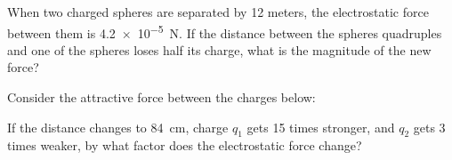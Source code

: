 \documentclass[dvipsnames]{article}
\numberwithin{equation}{section}
\numberwithin{figure}{section}
\begin{document}
\begin{exercise} \label{yCR62E}
    When two charged spheres are separated by 12 meters, the electrostatic force between them is \SI{4.2e-5}{N}. If the distance between the spheres quadruples and one of the spheres loses half its charge, what is the magnitude of the new force?
\end{exercise}

\begin{exercise} \label{y5ONvE}
    Consider the attractive force between the charges below:

\begin{center}
\end{center}

If the distance changes to \SI{84}{cm}, charge $q_1$ gets 15 times stronger, and $q_2$ gets 3 times weaker, by what factor does the electrostatic force change?
\end{exercise}
\end{document}
